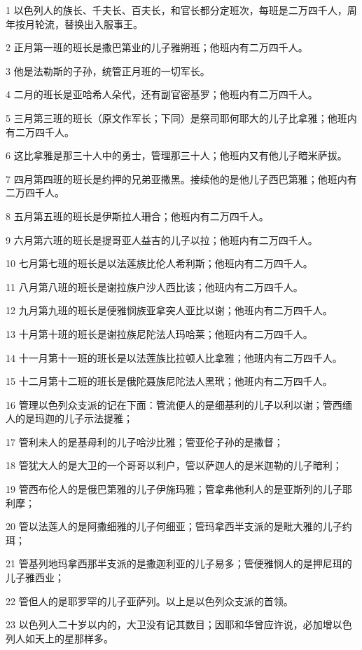 \par 1 以色列人的族长、千夫长、百夫长，和官长都分定班次，每班是二万四千人，周年按月轮流，替换出入服事王。
\par 2 正月第一班的班长是撒巴第业的儿子雅朔班；他班内有二万四千人。
\par 3 他是法勒斯的子孙，统管正月班的一切军长。
\par 4 二月的班长是亚哈希人朵代，还有副官密基罗；他班内有二万四千人。
\par 5 三月第三班的班长（原文作军长；下同）是祭司耶何耶大的儿子比拿雅；他班内有二万四千人。
\par 6 这比拿雅是那三十人中的勇士，管理那三十人；他班内又有他儿子暗米萨拔。
\par 7 四月第四班的班长是约押的兄弟亚撒黑。接续他的是他儿子西巴第雅；他班内有二万四千人。
\par 8 五月第五班的班长是伊斯拉人珊合；他班内有二万四千人。
\par 9 六月第六班的班长是提哥亚人益吉的儿子以拉；他班内有二万四千人。
\par 10 七月第七班的班长是以法莲族比伦人希利斯；他班内有二万四千人。
\par 11 八月第八班的班长是谢拉族户沙人西比该；他班内有二万四千人。
\par 12 九月第九班的班长是便雅悯族亚拿突人亚比以谢；他班内有二万四千人。
\par 13 十月第十班的班长是谢拉族尼陀法人玛哈莱；他班内有二万四千人。
\par 14 十一月第十一班的班长是以法莲族比拉顿人比拿雅；他班内有二万四千人。
\par 15 十二月第十二班的班长是俄陀聂族尼陀法人黑玳；他班内有二万四千人。
\par 16 管理以色列众支派的记在下面：管流便人的是细基利的儿子以利以谢；管西缅人的是玛迦的儿子示法提雅；
\par 17 管利未人的是基母利的儿子哈沙比雅；管亚伦子孙的是撒督；
\par 18 管犹大人的是大卫的一个哥哥以利户，管以萨迦人的是米迦勒的儿子暗利；
\par 19 管西布伦人的是俄巴第雅的儿子伊施玛雅；管拿弗他利人的是亚斯列的儿子耶利摩；
\par 20 管以法莲人的是阿撒细雅的儿子何细亚；管玛拿西半支派的是毗大雅的儿子约珥；
\par 21 管基列地玛拿西那半支派的是撒迦利亚的儿子易多；管便雅悯人的是押尼珥的儿子雅西业；
\par 22 管但人的是耶罗罕的儿子亚萨列。以上是以色列众支派的首领。
\par 23 以色列人二十岁以内的，大卫没有记其数目；因耶和华曾应许说，必加增以色列人如天上的星那样多。
